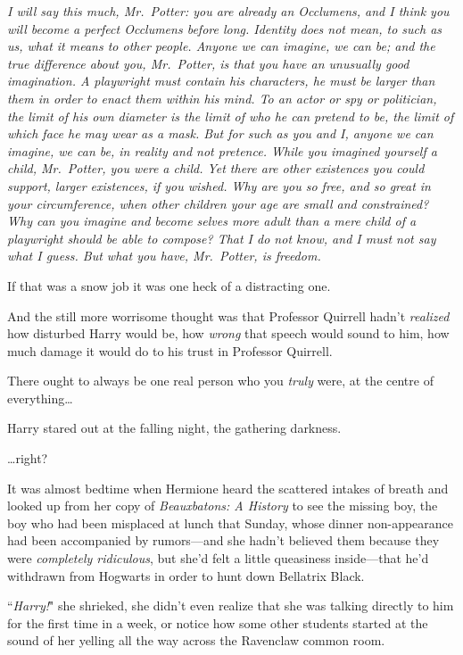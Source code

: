 \emph{I will say this much, Mr.~Potter: you are already an Occlumens, and I think you will become a perfect Occlumens before long. Identity does not mean, to such as us, what it means to other people. Anyone we can imagine, we can be; and the true difference about you, Mr.~Potter, is that you have an unusually good imagination. A playwright must contain his characters, he must be larger than them in order to enact them within his mind. To an actor or spy or politician, the limit of his own diameter is the limit of who he can pretend to be, the limit of which face he may wear as a mask. But for such as you and I, anyone we can imagine, we can \emph{be}, in reality and not pretence. While you imagined yourself a child, Mr.~Potter, you \emph{were} a child. Yet there are other existences you could support, larger existences, if you wished. Why are you so free, and so great in your circumference, when other children your age are small and constrained? Why can you imagine and \emph{become} selves more adult than a mere child of a playwright should be able to compose? That I do not know, and I must not say what I guess. But what you have, Mr.~Potter, is freedom.}

If that was a snow job it was one heck of a distracting one.

And the still more worrisome thought was that Professor Quirrell hadn't \emph{realized} how disturbed Harry would be, how \emph{wrong} that speech would sound to him, how much damage it would do to his trust in Professor Quirrell.

There ought to always be one real person who you \emph{truly} were, at the centre of everything{\ldots}

Harry stared out at the falling night, the gathering darkness.

{\ldots}right?

\later

It was almost bedtime when Hermione heard the scattered intakes of breath and looked up from her copy of \emph{Beauxbatons: A History} to see the missing boy, the boy who had been misplaced at lunch that Sunday, whose dinner non-appearance had been accompanied by rumors---and she hadn't believed them because they were \emph{completely ridiculous}, but she'd felt a little queasiness inside---that he'd withdrawn from Hogwarts in order to hunt down Bellatrix Black.

``\emph{Harry!}" she shrieked, she didn't even realize that she was talking directly to him for the first time in a week, or notice how some other students started at the sound of her yelling all the way across the Ravenclaw common room.

